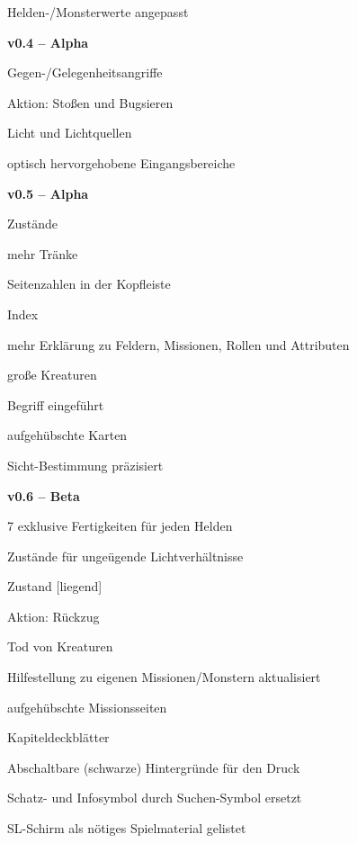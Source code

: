 {{		\item[A]  Helden-/Monsterwerte angepasst
		\item     \textbf{v0.4 -- Alpha}
		\item[E]  Gegen-/Gelegenheitsangriffe
		\item[E]  Aktion: Stoßen und Bugsieren
		\item[E]  Licht und Lichtquellen
		\item[M]  optisch hervorgehobene Eingangsbereiche
		\item     \textbf{v0.5 -- Alpha}
		\item[E]  Zustände
		\item[E]  mehr Tränke
		\item[L]  Seitenzahlen in der Kopfleiste
		\item[A]  Index
		\item[E]  mehr Erklärung zu Feldern, Missionen, Rollen und Attributen
		\item[E]  große Kreaturen
		\item[E]  Begriff  eingeführt
		\item[M]  aufgehübschte Karten
		\item[E]  Sicht-Bestimmung präzisiert
		\item     \textbf{v0.6 -- Beta}
		\item[E]  7 exklusive Fertigkeiten für jeden Helden
		\item[E]  Zustände für ungeügende Lichtverhältnisse
		\item[E]  Zustand [liegend]
		\item[E]  Aktion: Rückzug
		\item[E]  Tod von Kreaturen
		\item[E]  Hilfestellung zu eigenen Missionen/Monstern aktualisiert
		\item[M]  aufgehübschte Missionsseiten
		\item[A]  Kapiteldeckblätter
		\item[A]  Abschaltbare (schwarze) Hintergründe für den Druck
		\item[A]  Schatz- und Infosymbol durch Suchen-Symbol ersetzt
		\item[A]  SL-Schirm als nötiges Spielmaterial gelistet
	}

	\newpage \vspace*{1cm}
}
